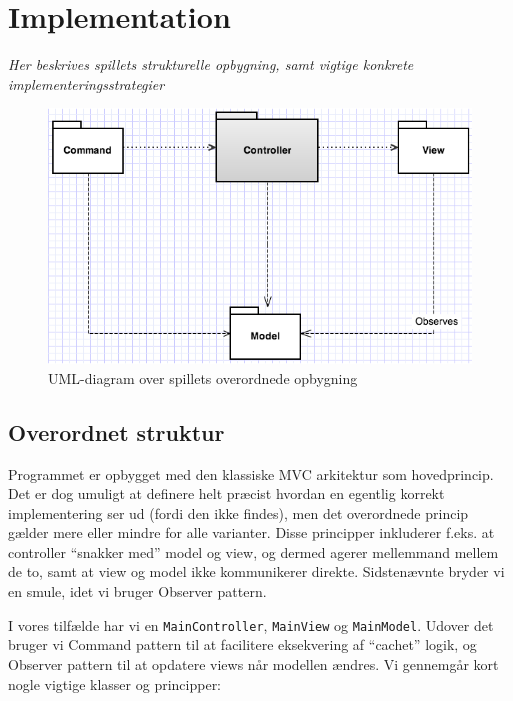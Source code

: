 \documentclass[titlepage,danish]{article}
\newcommand{\code}[1]{\texttt{#1}}
\begin{document}
\section{Implementation}
\emph{Her beskrives spillets strukturelle opbygning, samt vigtige konkrete implementeringsstrategier}
\begin{figure}[h!]
  \centering
  \includegraphics[scale=0.60]{MVC.png}
  \caption{UML-diagram over spillets overordnede opbygning}
  \label{fig:MVC_diagram}
  \end{figure}
\subsection{Overordnet struktur}
Programmet er opbygget med den klassiske MVC arkitektur som hovedprincip. Det er dog umuligt at definere helt
præcist hvordan en egentlig korrekt implementering ser ud (fordi den ikke findes), men det
overordnede princip gælder mere eller mindre for alle varianter. Disse principper inkluderer
f.eks. at controller ``snakker med'' model og view, og dermed agerer mellemmand mellem de to, samt
at view og model ikke kommunikerer direkte. Sidstenævnte bryder vi en smule, idet vi bruger Observer
pattern.

I vores tilfælde har vi en \code{MainController}, \code{MainView} og \code{MainModel}. Udover det
bruger vi Command pattern til at facilitere eksekvering af ``cachet'' logik, og Observer pattern til
at opdatere views når modellen ændres. Vi gennemgår kort nogle vigtige klasser og principper:
\end{document}

